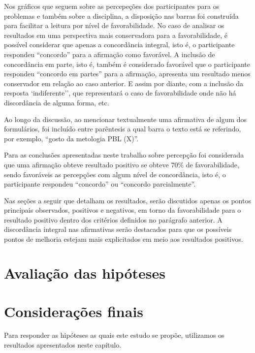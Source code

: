 Nos gráficos que seguem sobre as percepeções dos participantes para os
problemas e também sobre a disciplina, a disposição nas barras
foi construída para facilitar a leitura por nível de favorabilidade.
No caso de analisar os resultados em uma perspectiva mais conservadora
para a favorabilidade, é possível considerar que apenas a concordância
integral, isto é, o participante respondeu ``concordo'' para
a afirmação como favorável.
A inclusão de concordância em parte, isto é, também é considerado favorável que
o participante respondeu ``concordo em partes'' para a afirmação,
apresenta um resultado menos conservador em relação ao caso anterior.
E assim por diante, com a inclusão da resposta `indiferente'', que
representará o caso de favorabilidade onde não há discordância de alguma forma,
etc.

Ao longo da discussão, ao mencionar textualmente uma afirmativa de
algum dos formulários, foi incluído entre parêntesis a qual barra o texto
está se referindo, por exemplo, ``gosto da metologia PBL (X)''.

Para as conclusões apresentadas neste trabalho sobre percepção foi
considerada que uma afirmação obteve resultado positivo
se obteve $70\%$ de favorabilidade,
sendo favoráveis as percepções com algum nível de concordância,
isto é, o participante respondeu ``concordo''
ou ``concordo parcialmente''.

Nas seções a seguir que detalham os resultados, serão discutidos apenas os
pontos principais observados, positivos e negativos, em torno da
favorabilidade para o resultado positivo dentro dos critérios
definidos no parágrafo anterior.
A discordância integral nas afirmativas serão destacados para que
os possíveis pontos de melhoria estejam mais explicitados em meio
aos resultados positivos.




\section{Avaliação das hipóteses}
\label{sec-avaliacao-hipoteses}

\section{Considerações finais}
\label{sec-consideracoes-resultados}

Para responder as hipóteses as quais este estudo se propõe, utilizamos
os resultados apresentados neste capítulo.
